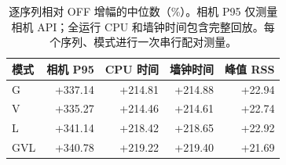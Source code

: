\begin{table}[tb]
\caption{逐序列相对 OFF 增幅的中位数（\%）。相机 P95 仅测量相机 API；全运行 CPU 和墙钟时间包含完整回放。每个序列、模式进行一次串行配对测量。}\label{tab:cost}
\centering\small
\begin{tabular}{lrrrr}
\toprule
模式 & 相机 P95 & CPU 时间 & 墙钟时间 & 峰值 RSS \\
\midrule
G & +337.14 & +214.81 & +214.88 & +22.94 \\
V & +335.27 & +214.46 & +214.61 & +22.74 \\
L & +341.14 & +218.42 & +218.65 & +22.92 \\
GVL & +340.78 & +219.22 & +219.40 & +21.69 \\
\bottomrule
\end{tabular}
\end{table}
